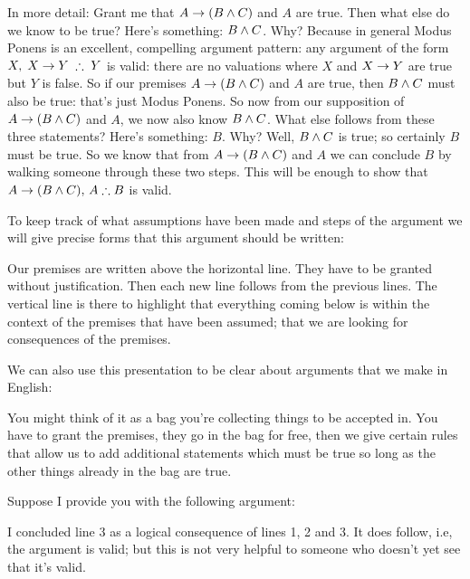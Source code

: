 In more detail:
Grant me that $A\rightarrow (B\mathbin{\wedge} C)$ and $A$ are true. Then what else do we know to be true? Here's something: $B\mathbin{\wedge} C$. Why? Because in general Modus Ponens is an excellent, compelling argument pattern: any argument of the form $X,\;X\eif Y\;\therefore\;Y$ is valid: there are no valuations where $X$ and $X\rightarrow Y$ are true but $Y$ is false. So if our premises  $A\rightarrow (B\mathbin{\wedge} C)$ and $A$ are true, then $B\mathbin{\wedge} C$ must also be true: that's just Modus Ponens. So now from our supposition of $A\rightarrow(B\mathbin{\wedge} C)$ and $A$, we now also know $B\mathbin{\wedge} C$. What else follows from these three statements? Here's something: $B$. Why? Well, $B\mathbin{\wedge} C$ is true; so certainly $B$ must be true. So we know that from $A\rightarrow(B\mathbin{\wedge} C)$ and $A$ we can conclude $B$ by walking someone through these two steps. This will be enough to show that $A\eif(B\eand C),\,A\therefore B$ is valid.

To keep track of what assumptions have been made and steps of the argument we will give precise forms that this argument should be written:
\begin{pf}
\end{pf}
Our premises are written above the horizontal line. They have to be granted without justification. Then each new line follows from the previous lines. The vertical line is there to highlight that everything coming below is within the context of the premises that have been assumed; that we are looking for consequences of the premises.

We can also use this presentation to be clear about arguments that we make in English:
\begin{pf}
\end{pf}

You might think of it as a bag you're collecting things to be accepted in. You have to grant the premises, they go in the bag for free, then we give certain rules that allow us to add additional statements which must be true so long as the other things already in the bag are true.


Suppose I provide you with the following argument:
\begin{pf}
\end{pf}
I concluded line 3 as a logical consequence of lines 1, 2 and 3. It does follow, i.e, the argument is valid; but this is not very helpful to someone who doesn't yet see that it's valid.

